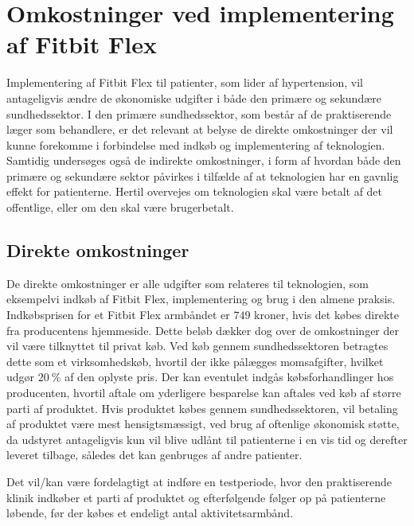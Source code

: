 
\section{Omkostninger ved implementering af Fitbit Flex}


Implementering af Fitbit Flex til patienter, som lider af hypertension, vil antageligvis ændre de økonomiske udgifter i både den primære og sekundære sundhedssektor. I den primære sundhedssektor, som består af de praktiserende læger som behandlere, er det relevant at belyse de direkte omkostninger der vil kunne forekomme i forbindelse med indkøb og implementering af teknologien. Samtidig undersøges også de indirekte omkostninger, i form af hvordan både den primære og sekundære sektor påvirkes i tilfælde af at teknologien har en gavnlig effekt for patienterne. Hertil overvejes om teknologien skal være betalt af det offentlige, eller om den skal være brugerbetalt. 

\subsection{Direkte omkostninger}

De direkte omkostninger er alle udgifter som relateres til teknologien, som eksempelvi indkøb af Fitbit Flex, implementering og brug i den almene praksis.  
Indkøbsprisen for et Fitbit Flex armbåndet er $749$ kroner, hvis det købes direkte fra producentens hjemmeside. Dette beløb dækker dog over de omkostninger der vil være tilknyttet til privat køb. 
Ved køb gennem sundhedssektoren betragtes dette som et virksomhedskøb, hvortil der ikke pålægges momsafgifter, hvilket udgør $20~\%$ af den oplyste pris. 
Der kan eventulet indgås købsforhandlinger hos producenten, hvortil aftale om yderligere besparelse kan aftales ved køb af større parti af produktet. Hvis produktet købes gennem sundhedssektoren, vil betaling af produktet være mest hensigtsmæssigt, ved brug af oftenlige økonomisk støtte, da udstyret antageligvis kun vil blive udlånt til patienterne i en vis tid og derefter leveret tilbage, således det kan genbruges af andre patienter. 

Det vil/kan være fordelagtigt at indføre en testperiode, hvor den praktiserende klinik indkøber et parti af produktet og efterfølgende følger op på patienterne løbende, før der købes et endeligt antal aktivitetsarmbånd.


